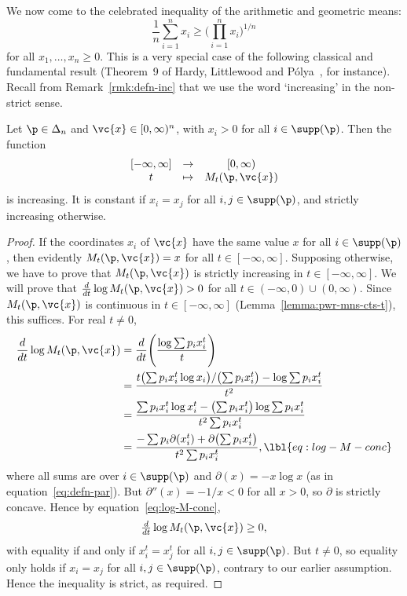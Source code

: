 We now come to the celebrated inequality of the arithmetic and geometric
means:
\[
\frac{1}{n} \sum_{i = 1}^n x_i
\geq
\Biggl( \prod_{i = 1}^n x_i \Biggr)^{1/n}
\]
for all $x_1, \ldots, x_n \geq 0$.  This is a very special case of the
following classical and fundamental result (Theorem~9 of Hardy, Littlewood
and P\'olya~\cite{HLP}, for instance).  Recall from
Remark~\ref{rmk:defn-inc} that we use the word `increasing' in the
non-strict sense.

\begin{thm}
% 
Let $\p \in \Delta_n$ and $\vc{x} \in [0, \infty)^n$, with $x_i > 0$ for
  all $i \in \supp(\p)$.  Then the function
\[
\begin{array}{ccc}
[-\infty, \infty]       &\to            &[0, \infty)   \\
t                       &\mapsto        &M_t(\p, \vc{x})
\end{array}
\]
is increasing.  It is constant if $x_i = x_j$ for all $i, j \in \supp(\p)$,
and strictly increasing otherwise.
\end{thm}

\begin{proof}
If the coordinates $x_i$ of $\vc{x}$ have the same value $x$ for all $i \in
\supp(\p)$, then evidently $M_t(\p, \vc{x}) = x$ for all $t \in [-\infty,
  \infty]$.  Supposing otherwise, we have to prove that $M_t(\p, \vc{x})$
is strictly increasing in $t \in [-\infty, \infty]$.  We will prove that
$\tfrac{d}{dt} \log M_t(\p, \vc{x}) > 0$ for all $t \in (-\infty, 0) \cup
(0, \infty)$.  Since $M_t(\p, \vc{x})$ is continuous in $t \in [-\infty,
  \infty]$ (Lemma~\ref{lemma:pwr-mns-cts-t}), this suffices.  For real $t
\neq 0$, 
% 
\begin{align}
\frac{d}{dt} \log M_t(\p, \vc{x})      &
=
\frac{d}{dt} \Biggl( \frac{\log \sum p_i x_i^t}{t} \Biggr)      
\nonumber       \\
&
=
\frac{t \bigl(\sum p_i x_i^t \log x_i\bigr)/
\bigl(\sum p_i x_i^t\bigr) - \log \sum p_i x_i^t}%
{t^2}   
\nonumber       \\
&
=
\frac{\sum p_i x_i^t \log x_i^t 
- \bigl(\sum p_i x_i^t\bigr) \log \sum p_i x_i^t}%
{t^2 \sum p_i x_i^t}    
\nonumber       \\
&
=
\frac{- \sum p_i \partial(x_i^t) + \partial \bigl(\sum p_i x_i^t\bigr)}%
{t^2 \sum p_i x_i^t},
\lbl{eq:log-M-conc}
\end{align}
% 
where all sums are over $i \in \supp(\p)$ and $\partial(x) = -x\log x$ (as
in equation~\eqref{eq:defn-par}).  But $\partial''(x) = -1/x < 0$ for all
$x > 0$, so $\partial$ is strictly concave.  Hence by
equation~\eqref{eq:log-M-conc},
\[
\tfrac{d}{dt} \log M_t(\p, \vc{x}) \geq 0,
\]
with equality if and only if $x_i^t = x_j^t$ for all $i, j \in \supp(\p)$.
But $t \neq 0$, so equality only holds if $x_i = x_j$ for all $i, j \in
\supp(\p)$, contrary to our earlier assumption.  Hence the inequality is
strict, as required.
\end{proof}

